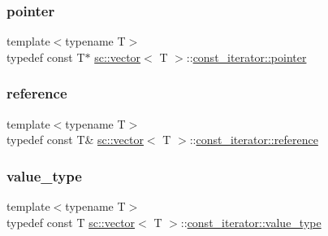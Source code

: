 \mbox{\label{classsc_1_1vector_1_1const__iterator_a8548fb2f328af0cee731c77f7ca9c9a3}} 
\subsubsection{\texorpdfstring{pointer}{pointer}}
{\footnotesize\ttfamily template$<$typename T$>$ \\
typedef const T$\ast$ \mbox{\hyperlink{classsc_1_1vector}{sc\+::vector}}$<$ T $>$\+::\mbox{\hyperlink{classsc_1_1vector_1_1const__iterator_a8548fb2f328af0cee731c77f7ca9c9a3}{const\+\_\+iterator\+::pointer}}}

\mbox{\label{classsc_1_1vector_1_1const__iterator_a750fedbe98f230fe9bf520117730485b}} 
\subsubsection{\texorpdfstring{reference}{reference}}
{\footnotesize\ttfamily template$<$typename T$>$ \\
typedef const T\& \mbox{\hyperlink{classsc_1_1vector}{sc\+::vector}}$<$ T $>$\+::\mbox{\hyperlink{classsc_1_1vector_1_1const__iterator_a750fedbe98f230fe9bf520117730485b}{const\+\_\+iterator\+::reference}}}

\mbox{\label{classsc_1_1vector_1_1const__iterator_a85871595aa6ab1463586462be441d5b8}} 
\subsubsection{\texorpdfstring{value\+\_\+type}{value\_type}}
{\footnotesize\ttfamily template$<$typename T$>$ \\
typedef const T \mbox{\hyperlink{classsc_1_1vector}{sc\+::vector}}$<$ T $>$\+::\mbox{\hyperlink{classsc_1_1vector_1_1const__iterator_a85871595aa6ab1463586462be441d5b8}{const\+\_\+iterator\+::value\+\_\+type}}}



